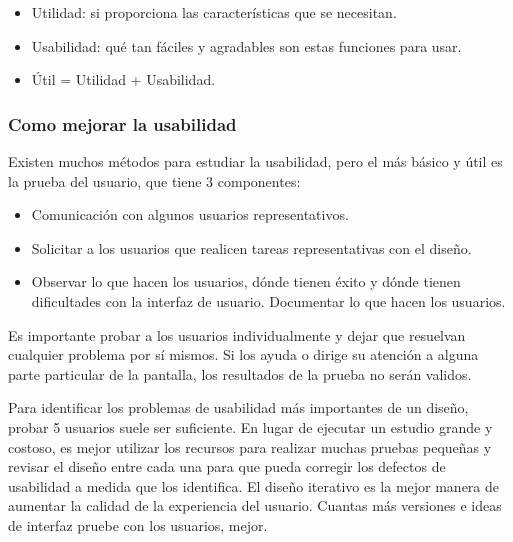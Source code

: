 	\begin{itemize}
		\item Utilidad: si proporciona las características que se necesitan.
		
		\item Usabilidad: qué tan fáciles y agradables son estas funciones para usar.
		
		\item Útil = Utilidad + Usabilidad.
	\end{itemize}

	\subsubsection{Como mejorar la usabilidad}
		\par 
			Existen muchos métodos para estudiar la usabilidad, pero el más básico y útil es la prueba del usuario, que tiene 3 componentes:
		\begin{itemize}
			\item Comunicación con algunos usuarios representativos.
			
			\item Solicitar a los usuarios que realicen tareas representativas con el diseño.
			
			\item Observar lo que hacen los usuarios, dónde tienen éxito y dónde tienen dificultades con la interfaz de usuario. Documentar lo que hacen los usuarios.
		\end{itemize}	
	
		\par \noindent
			Es importante probar a los usuarios individualmente y dejar que resuelvan cualquier problema por sí mismos. Si los ayuda o dirige su atención a alguna parte particular de la pantalla, los resultados de la prueba no serán validos.
			
		\par \noindent
			Para identificar los problemas de usabilidad más importantes de un diseño, probar 5 usuarios suele ser suficiente. En lugar de ejecutar un estudio grande y costoso, es mejor utilizar los recursos para realizar muchas pruebas pequeñas y revisar el diseño entre cada una para que pueda corregir los defectos de usabilidad a medida que los identifica. El diseño iterativo es la mejor manera de aumentar la calidad de la experiencia del usuario. Cuantas más versiones e ideas de interfaz pruebe con los usuarios, mejor.
			
\clearpage
\thispagestyle{plain}

